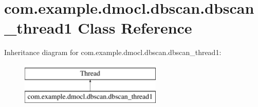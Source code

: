 \hypertarget{classcom_1_1example_1_1dmocl_1_1dbscan_1_1dbscan__thread1}{}\section{com.\+example.\+dmocl.\+dbscan.\+dbscan\+\_\+thread1 Class Reference}
\label{classcom_1_1example_1_1dmocl_1_1dbscan_1_1dbscan__thread1}
Inheritance diagram for com.\+example.\+dmocl.\+dbscan.\+dbscan\+\_\+thread1\+:\begin{figure}[H]
\begin{center}
\leavevmode
\includegraphics[height=2.000000cm]{classcom_1_1example_1_1dmocl_1_1dbscan_1_1dbscan__thread1}
\end{center}
\end{figure}
